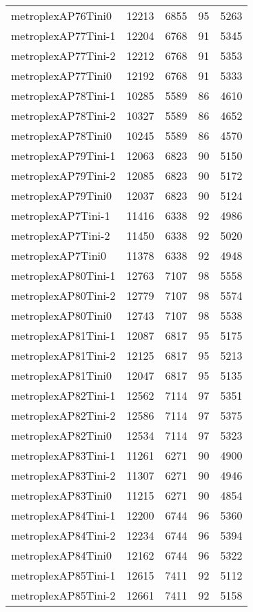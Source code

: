 \documentclass[../../../thesis.tex]{subfiles}
\begin{document}
\begin{longtable}{lrrrr}
metroplexAP76Tini0 & 12213 & 6855 & 95 & 5263 \\
metroplexAP77Tini-1 & 12204 & 6768 & 91 & 5345 \\
metroplexAP77Tini-2 & 12212 & 6768 & 91 & 5353 \\
metroplexAP77Tini0 & 12192 & 6768 & 91 & 5333 \\
metroplexAP78Tini-1 & 10285 & 5589 & 86 & 4610 \\
metroplexAP78Tini-2 & 10327 & 5589 & 86 & 4652 \\
metroplexAP78Tini0 & 10245 & 5589 & 86 & 4570 \\
metroplexAP79Tini-1 & 12063 & 6823 & 90 & 5150 \\
metroplexAP79Tini-2 & 12085 & 6823 & 90 & 5172 \\
metroplexAP79Tini0 & 12037 & 6823 & 90 & 5124 \\
metroplexAP7Tini-1 & 11416 & 6338 & 92 & 4986 \\
metroplexAP7Tini-2 & 11450 & 6338 & 92 & 5020 \\
metroplexAP7Tini0 & 11378 & 6338 & 92 & 4948 \\
metroplexAP80Tini-1 & 12763 & 7107 & 98 & 5558 \\
metroplexAP80Tini-2 & 12779 & 7107 & 98 & 5574 \\
metroplexAP80Tini0 & 12743 & 7107 & 98 & 5538 \\
metroplexAP81Tini-1 & 12087 & 6817 & 95 & 5175 \\
metroplexAP81Tini-2 & 12125 & 6817 & 95 & 5213 \\
metroplexAP81Tini0 & 12047 & 6817 & 95 & 5135 \\
metroplexAP82Tini-1 & 12562 & 7114 & 97 & 5351 \\
metroplexAP82Tini-2 & 12586 & 7114 & 97 & 5375 \\
metroplexAP82Tini0 & 12534 & 7114 & 97 & 5323 \\
metroplexAP83Tini-1 & 11261 & 6271 & 90 & 4900 \\
metroplexAP83Tini-2 & 11307 & 6271 & 90 & 4946 \\
metroplexAP83Tini0 & 11215 & 6271 & 90 & 4854 \\
metroplexAP84Tini-1 & 12200 & 6744 & 96 & 5360 \\
metroplexAP84Tini-2 & 12234 & 6744 & 96 & 5394 \\
metroplexAP84Tini0 & 12162 & 6744 & 96 & 5322 \\
metroplexAP85Tini-1 & 12615 & 7411 & 92 & 5112 \\
metroplexAP85Tini-2 & 12661 & 7411 & 92 & 5158 \\

\end{longtable}
\end{document}
